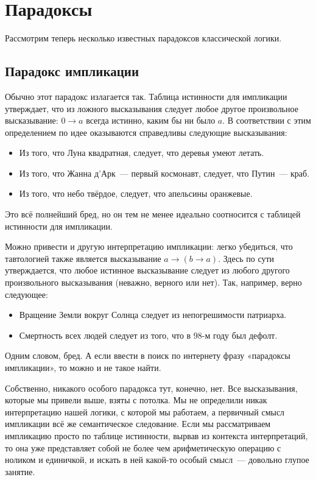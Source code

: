 \section{Парадоксы}

Рассмотрим теперь несколько известных парадоксов классической логики.

\subsection{Парадокс импликации}

Обычно этот парадокс излагается так. Таблица истинности для импликации утверждает, что из ложного высказывания следует любое другое произвольное высказывание: $0 \rightarrow a$ всегда истинно, каким бы ни было $a$. В соответствии с этим определением по идее оказываются справедливы следующие высказывания:

\begin{itemize}
\item Из того, что Луна квадратная, следует, что деревья умеют летать.
\item Из того, что Жанна д’Арк~— первый космонавт, следует, что Путин~— краб.
\item Из того, что небо твёрдое, следует, что апельсины оранжевые.
\end{itemize}

Это всё полнейший бред, но он тем не менее идеально соотносится с таблицей истинности для импликации.

Можно привести и другую интерпретацию импликации: легко убедиться, что тавтологией также является высказывание $a \rightarrow (b \rightarrow a)$. Здесь по сути утверждается, что любое истинное высказывание следует из любого другого произвольного высказывания (неважно, верного или нет). Так, например, верно следующее:

\begin{itemize}
\item Вращение Земли вокруг Солнца следует из непогрешимости патриарха.
\item Смертность всех людей следует из того, что в 98-м году был дефолт.
\end{itemize}

Одним словом, бред. А если ввести в поиск по интернету фразу «парадоксы импликации», то можно и не такое найти.

Собственно, никакого особого парадокса тут, конечно, нет. Все высказывания, которые мы привели выше, взяты с потолка. Мы не определили никак интерпретацию нашей логики, с которой мы работаем, а первичный смысл импликации всё же семантическое следование. Если мы рассматриваем импликацию просто по таблице истинности, вырвав из контекста интерпретаций, то она уже представляет собой не более чем арифметическую операцию с ноликом и единичкой, и искать в ней какой-то особый смысл~— довольно глупое занятие.

